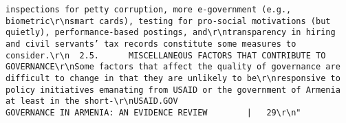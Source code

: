 \documentclass[
]{article}
\begin{document}
\begin{verbatim}
inspections for petty corruption, more e-government (e.g., biometric\r\nsmart cards), testing for pro-social motivations (but quietly), performance-based postings, and\r\ntransparency in hiring and civil servants’ tax records constitute some measures to consider.\r\n  2.5.      MISCELLANEOUS FACTORS THAT CONTRIBUTE TO GOVERNANCE\r\nSome factors that affect the quality of governance are difficult to change in that they are unlikely to be\r\nresponsive to policy initiatives emanating from USAID or the government of Armenia at least in the short-\r\nUSAID.GOV                                                  GOVERNANCE IN ARMENIA: AN EVIDENCE REVIEW        |   29\r\n"                                                                                                                                                                                                                                                                                                                                                                                                                                                                                                                                                                                                                                                                                                                                                                                                                                                                                                                                                                                                                                                                                             

\end{verbatim}
\end{document}
